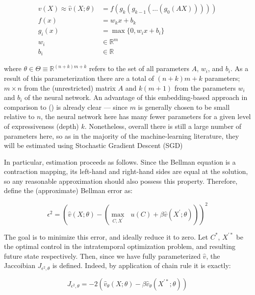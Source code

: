 \documentclass{article}
\begin{document}
\begin{align}
    v(X) \approx \hat{v}(X ; \theta) &= f(g_k(g_{k-1}(... (g_0(AX))))) \\
    f(x) &= w_k x + b_k \\
    g_i(x) &= \max \{ 0, w_i x + b_i \} \\
    w_i &\in \mathbb{R}^m \\
    b_i &\in \mathbb{R}
\end{align}

where $\theta \in \Theta \equiv \mathbb{R}^{(n + k) m + k}$ refers to the set of all parameters $A$, $w_i$, and $b_i$. As a result of this parameterization there are a total of $(n + k) m + k$ parameters; $m \times n$ from the (unrestricted) matrix $A$ and $k (m + 1)$ from the parameters $w_i$ and $b_i$ of the neural network. An advantage of this embedding-based approach in comparison to \citeauthor{duarte2018machine} (\citeyear{duarte2018machine}) is already clear --- since $m$ is generally chosen to be small relative to $n$, the neural network here has many fewer parameters for a given level of expressiveness (depth) $k$. Nonetheless, overall there is still a large number of parameters here, so as in the majority of the machine-learning literature, they will be estimated using Stochastic Gradient Descent (SGD)

In particular, estimation proceeds as follows. Since the Bellman equation is a contraction mapping, its left-hand and right-hand sides are equal at the solution, so any reasonable approximation should also possess this property. Therefore, define the (approximate) Bellman error as:

\begin{equation}
    \epsilon^2 = (\hat{v}(X ; \theta) - (\underset{C, X^\prime}{\max} \text{  } u(C) + \beta \hat{v}(X^\prime; \theta)))^2
\end{equation}

The goal is to minimize this error, and ideally reduce it to zero. Let $C^*$, $X^{\prime *}$ be the optimal control in the intratemporal optimization problem, and resulting future state respectively. Then, since we have fully parameterized $\hat{v}$, the Jaccoibian $J_{\epsilon^2,\theta}$ is defined. Indeed, by application of chain rule it is exactly:

\begin{equation}
    J_{\epsilon^2,\theta} = - 2 (\hat{v}_\theta(X; \theta) - \beta \hat{v}_\theta(X^{\prime *} ; \theta))
\end{equation}
\end{document}
